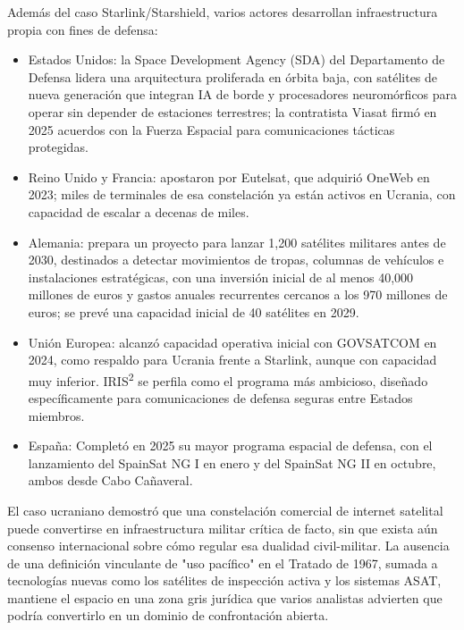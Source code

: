 Además del caso Starlink/Starshield, varios actores desarrollan infraestructura propia con fines de defensa:

\begin{itemize}
    \item{Estados Unidos}: la Space Development Agency (SDA) del Departamento de Defensa lidera una arquitectura proliferada en órbita baja, con satélites de nueva generación que integran IA de borde y procesadores neuromórficos para operar sin depender de estaciones terrestres; la contratista Viasat firmó en 2025 acuerdos con la Fuerza Espacial para comunicaciones tácticas protegidas.
    
    \item{Reino Unido y Francia}: apostaron por Eutelsat, que adquirió OneWeb en 2023; miles de terminales de esa constelación ya están activos en Ucrania, con capacidad de escalar a decenas de miles.
    
    \item{Alemania}: prepara un proyecto para lanzar 1,200 satélites militares antes de 2030, destinados a detectar movimientos de tropas, columnas de vehículos e instalaciones estratégicas, con una inversión inicial de al menos 40,000 millones de euros y gastos anuales recurrentes cercanos a los 970 millones de euros; se prevé una capacidad inicial de 40 satélites en 2029.
    
    \item{Unión Europea}: alcanzó capacidad operativa inicial con GOVSATCOM en 2024, como respaldo para Ucrania frente a Starlink, aunque con capacidad muy inferior. IRIS\textsuperscript{2} se perfila como el programa más ambicioso, diseñado específicamente para comunicaciones de defensa seguras entre Estados miembros.
    
    \item{España}: Completó en 2025 su mayor programa espacial de defensa, con el lanzamiento del SpainSat NG I en enero y del SpainSat NG II en octubre, ambos desde Cabo Cañaveral.
\end{itemize}

El caso ucraniano demostró que una constelación comercial de internet satelital puede convertirse en infraestructura militar crítica de facto, sin que exista aún consenso internacional sobre cómo regular esa dualidad civil-militar. La ausencia de una definición vinculante de "uso pacífico" en el Tratado de 1967, sumada a tecnologías nuevas como los satélites de inspección activa y los sistemas ASAT, mantiene el espacio en una zona gris jurídica que varios analistas advierten que podría convertirlo en un dominio de confrontación abierta.